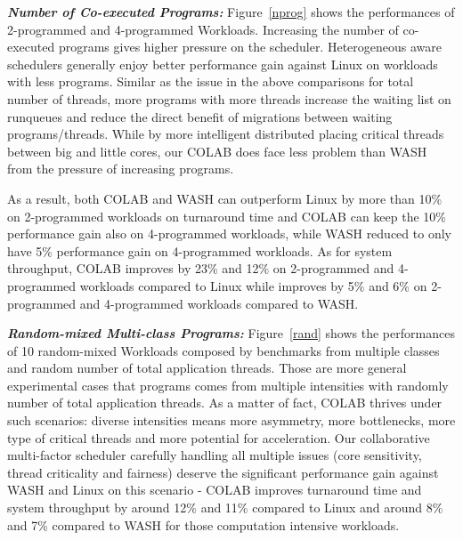 \textbf{\textit{Number of Co-executed Programs:}}
Figure~\ref{nprog} shows the performances of 2-programmed and 4-programmed Workloads. 
Increasing the number of co-executed programs gives higher pressure on the scheduler. Heterogeneous aware schedulers generally enjoy better performance gain against Linux on workloads with less programs. Similar as the issue in the above comparisons for total number of threads, more programs with more threads increase the waiting list on runqueues and reduce the direct benefit of migrations between waiting programs/threads. While by more intelligent distributed placing critical threads between big and little cores, our COLAB does face less problem than WASH from the pressure of increasing programs. 

As a result, both COLAB and WASH can outperform Linux by more than 10\% on 2-programmed workloads on turnaround time and COLAB can keep the 10\% performance gain also on 4-programmed workloads, while WASH reduced to only have 5\% performance gain on 4-programmed workloads. As for system throughput, COLAB improves by 23\% and 12\% on 2-programmed and 4-programmed workloads compared to Linux while improves by 5\% and 6\% on 2-programmed and 4-programmed workloads compared to WASH.

\textbf{\textit{Random-mixed Multi-class Programs:}}
Figure~\ref{rand} shows the performances of 10 random-mixed Workloads composed by benchmarks from multiple classes and random number of total application threads. %
Those are more general experimental cases that programs comes from multiple intensities with randomly number of total application threads. As a matter of fact, COLAB thrives under such scenarios: diverse intensities means more asymmetry, more bottlenecks, more type of critical threads and more potential for acceleration. Our collaborative multi-factor scheduler carefully handling all multiple issues (core sensitivity, thread criticality and fairness) deserve the significant performance gain against WASH and Linux on this scenario - COLAB improves turnaround time and system throughput by around 12\% and 11\% compared to Linux and around 8\% and 7\% compared to WASH for those computation intensive workloads. 



